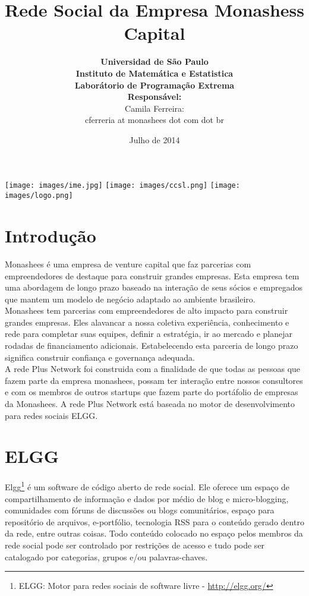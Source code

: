 \documentclass[12pt, letterpaper, onecolumn]{article}
\title{\bf \huge Rede Social da Empresa Monashess Capital}
\author{{\bf Universidad de São Paulo} \\ {\bf Instituto de Matemática e Estatistica} \\ {\bf  \large Laborátorio de Programação Extrema} \vspace{1cm}\\{
\bf  \large Responsável: }\\ Camila Ferreira: \\cferreria at monashees dot com dot br}
\date{Julho de 2014}
\begin{document}
\maketitle
\begin{center}
\texttt{[image: images/ime.jpg]}\hfil
\texttt{[image: images/ccsl.png]}\hfil
\texttt{[image: images/logo.png]}

\end{center}


\tableofcontents




\section{Introdução} 
Monashees é uma empresa de venture capital que faz parcerias com empreendedores de destaque para construir grandes empresas. Esta empresa tem uma abordagem de longo prazo baseado na interação de seus sócios e empregados que mantem um modelo de negócio adaptado ao ambiente brasileiro. \\

Monashees tem parcerias com empreendedores de alto impacto para construir grandes empresas. Eles alavancar a nossa coletiva experiência, conhecimento e rede para completar suas equipes, definir a estratégia, ir ao mercado e planejar rodadas de financiamento adicionais. Estabelecendo esta parceria de longo prazo significa construir confiança e governança adequada.\\

A rede Plus Network foi construida com a finalidade de que todas as pessoas que fazem parte da empresa monashees, possam ter interação entre nossos consultores e com os membros de outros startups que fazem parte do portáfolio de empresas da Monashees. A rede Plus Network está baseada no motor de desenvolvimento para redes sociais ELGG.



\section{ELGG}
Elgg\footnote{ELGG: Motor para redes sociais de software livre - \url{http://elgg.org/}} é um software de código aberto de rede social. Ele oferece um espaço de compartilhamento de informação e dados por médio de blog e micro-blogging, comunidades com fóruns de discussões ou blogs comunitários, espaço para repositório de arquivos, e-portfólio, tecnologia RSS para o conteúdo gerado dentro da rede, entre outras coisas. Todo conteúdo colocado no espaço pelos membros da rede social pode ser controlado por restrições de acesso e tudo pode ser catalogado por categorias, grupos e/ou palavras-chaves.\\
\end{document}
